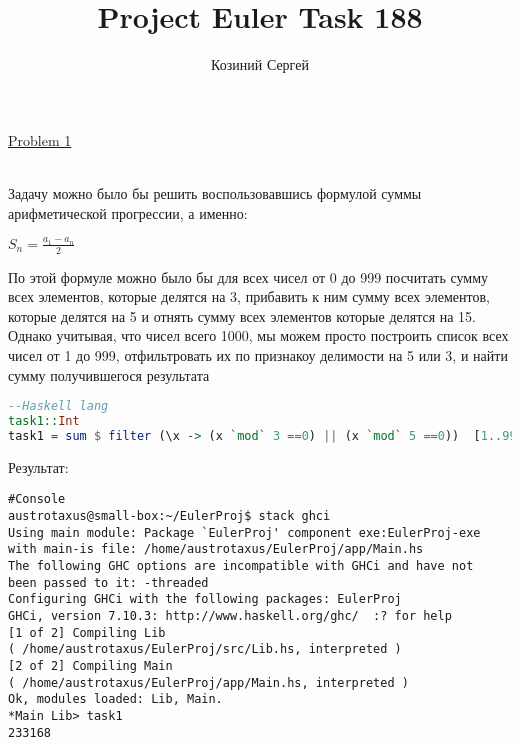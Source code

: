 \documentclass[11pt,a4paper]{article}
\title{Project Euler Task 188}
\author{Козиний Сергей}
\begin{document}
    
\maketitle
\href{''https://projecteuler.net/problem=1''}{Problem 1}

\\

Задачу можно было бы решить воспользовавшись формулой суммы арифметической прогрессии, а именно:

$S_n = \frac {a_1 -  a_n} 2$

По этой формуле можно было бы для всех чисел от 0 до 999 посчитать сумму всех элементов, которые делятся на 3, прибавить к ним сумму всех элементов, которые делятся на 5 и отнять сумму всех элементов которые делятся на 15. Однако учитывая, что чисел всего 1000, мы можем просто построить список всех чисел от 1 до 999, отфильтровать их по признакоу делимости на 5 или 3, и найти сумму получившегося результата

\begin{lstlisting}[language=Haskell]
--Haskell lang
task1::Int
task1 = sum $ filter (\x -> (x `mod` 3 ==0) || (x `mod` 5 ==0))  [1..999]
\end{lstlisting}

Результат:

\begin{lstlisting}
#Console
austrotaxus@small-box:~/EulerProj$ stack ghci
Using main module: Package `EulerProj' component exe:EulerProj-exe
with main-is file: /home/austrotaxus/EulerProj/app/Main.hs
The following GHC options are incompatible with GHCi and have not
been passed to it: -threaded
Configuring GHCi with the following packages: EulerProj
GHCi, version 7.10.3: http://www.haskell.org/ghc/  :? for help
[1 of 2] Compiling Lib
( /home/austrotaxus/EulerProj/src/Lib.hs, interpreted )
[2 of 2] Compiling Main
( /home/austrotaxus/EulerProj/app/Main.hs, interpreted )
Ok, modules loaded: Lib, Main. 
*Main Lib> task1
233168
\end{lstlisting}
\end{document}
